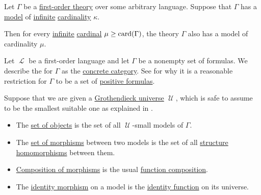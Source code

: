 \begin{theorem}\label{thm:upward_lowenheim_skolem_theorem}
  Let \( \Gamma \) be a \hyperref[def:first_order_theory]{first-order theory} over some arbitrary language. Suppose that \( \Gamma \) has a \hyperref[def:first_order_semantics/satisfiability]{model} of \hyperref[def:set_finiteness]{infinite} \hyperref[thm:cardinality_existence]{cardinality} \( \kappa \).

  Then for every \hyperref[def:set_finiteness]{infinite} \hyperref[def:cardinal]{cardinal} \( \mu \geq \operatorname{card}(\Gamma) \), the theory \( \Gamma \) also has a model of cardinality \( \mu \).
\end{theorem}

\begin{definition}\label{def:category_of_small_first_order_models}
  Let \( \mscrL \) be a first-order language and let \( \Gamma \) be a nonempty set of formulas. We describe the  for \( \Gamma \) as the \hyperref[def:concrete_category]{concrete category}. See  for why it is a reasonable restriction for \( \Gamma \) to be a set of \hyperref[def:positive_formula]{positive formulas}.

  Suppose that we are given a \hyperref[def:grothendieck_universe]{Grothendieck universe} \( \mscrU \), which is safe to assume to be the smallest suitable one as explained in .

  \begin{itemize}
    \item The \hyperref[def:category/objects]{set of objects} is the set of all \( \mscrU \)-small models of \( \Gamma \).

    \item The \hyperref[def:category/morphisms]{set of morphisms} between two models is the set of all \hyperref[def:first_order_homomorphism]{structure homomorphisms} between them.

    \item \hyperref[def:category/composition]{Composition of morphisms} is the usual \hyperref[def:multi_valued_function/composition]{function composition}.

    \item The \hyperref[def:category/identity]{identity morphism} on a model is the \hyperref[def:multi_valued_function/identity]{identity function} on its universe.
  \end{itemize}
\end{definition}

